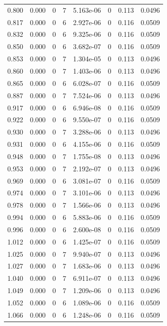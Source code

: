 \documentclass[preview]{standalone}
\begin{document}
{{{\begin{tabular}{L{1.2cm}C{1.2cm} C{0.3cm}C{0.5cm} C{1.4cm}C{1.4cm} C{1.4cm}C{1.4cm}}
  0.800  &  0.000  & 0     &  7 &  5.163e-06  & 0  & 0.113 &  0.0496   \\ 
  0.817  &  0.000  & 0     &  6 &  2.927e-06  & 0  & 0.116 &  0.0509   \\ 
  0.832  &  0.000  & 0     &  6 &  9.325e-06  & 0  & 0.116 &  0.0509   \\ 
  0.850  &  0.000  & 0     &  6 &  3.682e-07  & 0  & 0.116 &  0.0509   \\ 
  0.853  &  0.000  & 0     &  7 &  1.304e-05  & 0  & 0.113 &  0.0496   \\ 
  0.860  &  0.000  & 0     &  7 &  1.403e-06  & 0  & 0.113 &  0.0496   \\ 
  0.865  &  0.000  & 0     &  6 &  6.028e-07  & 0  & 0.116 &  0.0509   \\ 
  0.887  &  0.000  & 0     &  7 &  7.524e-06  & 0  & 0.113 &  0.0496   \\ 
  0.917  &  0.000  & 0     &  6 &  6.946e-08  & 0  & 0.116 &  0.0509   \\ 
  0.922  &  0.000  & 0     &  6 &  9.550e-07  & 0  & 0.116 &  0.0509   \\ 
  0.930  &  0.000  & 0     &  7 &  3.288e-06  & 0  & 0.113 &  0.0496   \\ 
  0.931  &  0.000  & 0     &  6 &  4.155e-06  & 0  & 0.116 &  0.0509   \\ 
  0.948  &  0.000  & 0     &  7 &  1.755e-08  & 0  & 0.113 &  0.0496   \\ 
  0.953  &  0.000  & 0     &  7 &  2.192e-07  & 0  & 0.113 &  0.0496   \\ 
  0.969  &  0.000  & 0     &  6 &  3.081e-07  & 0  & 0.116 &  0.0509   \\ 
  0.974  &  0.000  & 0     &  7 &  3.101e-06  & 0  & 0.113 &  0.0496   \\ 
  0.978  &  0.000  & 0     &  7 &  1.566e-06  & 0  & 0.113 &  0.0496   \\ 
  0.994  &  0.000  & 0     &  6 &  5.883e-06  & 0  & 0.116 &  0.0509   \\ 
  0.996  &  0.000  & 0     &  6 &  2.600e-08  & 0  & 0.116 &  0.0509   \\ 
  1.012  &  0.000  & 0     &  6 &  1.425e-07  & 0  & 0.116 &  0.0509   \\ 
  1.025  &  0.000  & 0     &  7 &  9.940e-07  & 0  & 0.113 &  0.0496   \\ 
  1.027  &  0.000  & 0     &  7 &  1.683e-06  & 0  & 0.113 &  0.0496   \\ 
  1.040  &  0.000  & 0     &  7 &  6.911e-07  & 0  & 0.113 &  0.0496   \\ 
  1.049  &  0.000  & 0     &  7 &  1.209e-06  & 0  & 0.113 &  0.0496   \\ 
  1.052  &  0.000  & 0     &  6 &  1.089e-06  & 0  & 0.116 &  0.0509   \\ 
  1.066  &  0.000  & 0     &  6 &  1.248e-06  & 0  & 0.116 &  0.0509   \\ 
\hline 
\end{tabular} 

}}}
\end{document}
